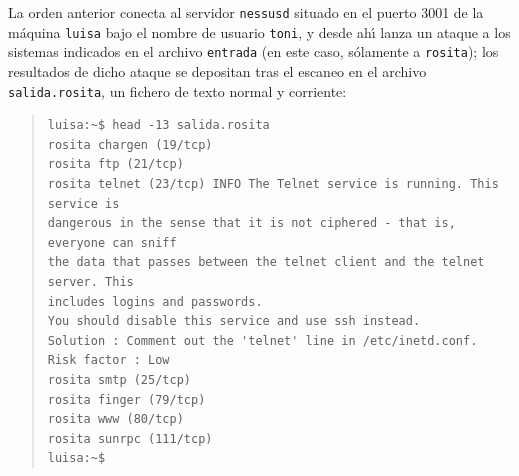 La orden anterior conecta al servidor {\tt nessusd} situado en el puerto 3001
de la m\'aquina {\tt luisa} bajo el nombre de usuario {\tt toni}, y desde 
ah\'{\i} lanza un ataque a los sistemas indicados en el archivo {\tt entrada}
(en este caso, s\'olamente a {\tt rosita}); los resultados de dicho ataque se
depositan tras el escaneo en el archivo {\tt salida.rosita}, un fichero de 
texto normal y corriente:
\begin{quote}
\begin{verbatim}
luisa:~$ head -13 salida.rosita
rosita chargen (19/tcp)
rosita ftp (21/tcp)
rosita telnet (23/tcp) INFO The Telnet service is running. This service is 
dangerous in the sense that it is not ciphered - that is, everyone can sniff
the data that passes between the telnet client and the telnet server. This 
includes logins and passwords.
You should disable this service and use ssh instead.
Solution : Comment out the 'telnet' line in /etc/inetd.conf.
Risk factor : Low
rosita smtp (25/tcp)
rosita finger (79/tcp)
rosita www (80/tcp)
rosita sunrpc (111/tcp)
luisa:~$
\end{verbatim}
\end{quote}
